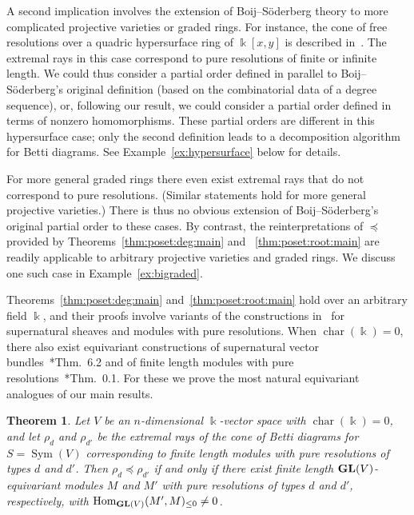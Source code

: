 \documentclass[12pt]{amsart}
\newtheorem{thm}[equation]{Theorem}
\theoremstyle{definition}
\newcommand{\ch}{\operatorname{char}}
\newcommand{\Hom}{\operatorname{Hom}}
\newcommand{\GL}{{\bf GL}}
\newcommand{\Sym}{\operatorname{Sym}}
\begin{document}
A second implication involves the extension of 
Boij--S\"oderberg theory to more complicated projective
varieties or graded rings.  
For instance, the cone of free resolutions over a quadric hypersurface ring of 
$\Bbbk[x,y]$ is described in~\cite{bbeg}.  The extremal rays in this case correspond
to pure resolutions of finite or infinite length.  We could thus consider
a partial order defined in parallel to Boij--S\"oderberg's original definition (based
on the combinatorial data of a degree sequence), or, following our result, we could consider
a partial order defined in terms of nonzero homomorphisms.
These partial orders are different in this hypersurface case; only the second definition leads to
a decomposition algorithm for Betti diagrams.  See Example~\ref{ex:hypersurface} below for details.

For more general graded rings there even exist extremal rays that do
not correspond to pure resolutions.  (Similar statements hold for more
general projective varieties.)  There is thus no obvious extension of
Boij--S\"oderberg's original partial order to these cases.  By
contrast, the reinterpretations of $\preceq$ provided by
Theorems~\ref{thm:poset:deg:main} and ~\ref{thm:poset:root:main} are
readily applicable to arbitrary projective varieties and graded rings.
We discuss one such case in Example~\ref{ex:bigraded}.

Theorems~\ref{thm:poset:deg:main} and~\ref{thm:poset:root:main} hold
over an arbitrary field $\Bbbk$, and their proofs involve variants of
the constructions in~\cite{EiScConjOfBS07} for supernatural sheaves
and modules with pure resolutions.  When $\ch(\Bbbk)=0$, there also
exist equivariant constructions of supernatural vector
bundles~\cite{EiScConjOfBS07}*{Thm.~6.2} and of finite length modules
with pure resolutions~\cite{efw}*{Thm.~0.1}.  For these we prove the most
natural equivariant analogues of 
our main results. 

\begin{thm}\label{thm:equivariant:deg}
Let $V$ be an $n$-dimensional $\Bbbk$-vector space with 
$\ch(\Bbbk)=0$, and let $\rho_d$ and $\rho_{d'}$ be
the extremal rays of the cone of Betti diagrams for $S=\Sym(V)$
corresponding to finite length modules 
with pure resolutions of types $d$ and $d'$.  
Then $\rho_d\preceq \rho_{d'}$ if and only if there
exist finite length $\GL(V)$-equivariant 
modules $M$ and $M'$ 
with pure resolutions of types $d$ and $d'$, respectively, 
with $\Hom_{\GL(V)}(M',M)_{\le 0}\ne 0$.
\end{thm}
\end{document}
